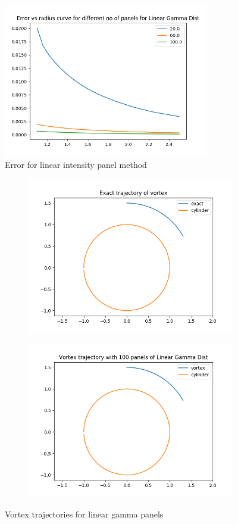 \documentclass[a4paper,11pt]{article}
\begin{document}
	
	\begin{figure}[h]
		\centering
		\includegraphics[width = 0.8\textwidth]{q1linear_error.png}
		\caption{Error for linear intensity panel method}
		\label{fig:3a}
	\end{figure}
		\begin{figure}[h]
			\centering
			\begin{subfigure}[h]{.5\textwidth}
				\centering
				\includegraphics[width=.8\linewidth]{Exact_sol.png}
				\caption{}
				\label{fig:3aa}
			\end{subfigure}%
			\begin{subfigure}[h]{.5\textwidth}
				\centering
				\includegraphics[width=.8\linewidth]{q2lin_vort_traj.png}
				\caption{}
				\label{fig:3ab}
			\end{subfigure}
			\caption{Vortex trajectories for linear gamma panels}
			
		\end{figure}
\end{document}
